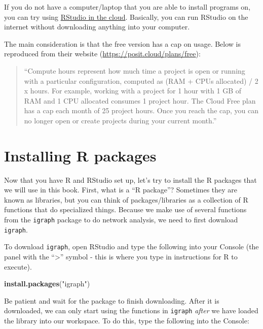\documentclass[
]{book}
\newenvironment{Shaded}{\begin{snugshade}}{\end{snugshade}}
\newcommand{\FunctionTok}[1]{\textcolor[rgb]{0.13,0.29,0.53}{\textbf{#1}}}
\newcommand{\NormalTok}[1]{#1}
\newcommand{\StringTok}[1]{\textcolor[rgb]{0.31,0.60,0.02}{#1}}
\begin{document}
If you do not have a computer/laptop that you are able to install programs on, you can try using \href{https://posit.cloud/}{RStudio in the cloud}. Basically, you can run RStudio on the internet without downloading anything into your computer.

The main consideration is that the free version has a cap on usage. Below is reproduced from their website (\url{https://posit.cloud/plans/free}):

\begin{quote}
``Compute hours represent how much time a project is open or running with a particular configuration, computed as (RAM + CPUs allocated) / 2 x hours. For example, working with a project for 1 hour with 1 GB of RAM and 1 CPU allocated consumes 1 project hour. The Cloud Free plan has a cap each month of 25 project hours. Once you reach the cap, you can no longer open or create projects during your current month.''
\end{quote}

\section{Installing R packages}\label{installing-r-packages}

Now that you have R and RStudio set up, let's try to install the R packages that we will use in this book. First, what is a ``R package''? Sometimes they are known as libraries, but you can think of packages/libraries as a collection of R functions that do specialized things. Because we make use of several functions from the \texttt{igraph} package to do network analysis, we need to first download \texttt{igraph}.

To download \texttt{igraph}, open RStudio and type the following into your Console (the panel with the ``\textgreater{}'' symbol - this is where you type in instructions for R to execute).

\begin{Shaded}
\begin{Highlighting}[]
\FunctionTok{install.packages}\NormalTok{(}\StringTok{"igraph"}\NormalTok{)}
\end{Highlighting}
\end{Shaded}

Be patient and wait for the package to finish downloading. After it is downloaded, we can only start using the functions in \texttt{igraph} \emph{after} we have loaded the library into our workspace. To do this, type the following into the Console:
\end{document}
